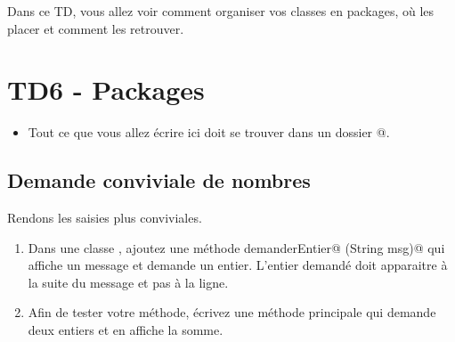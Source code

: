 \documentclass[a4paper,11pt]{article}
\date{2018 -- 2019}
\begin{document}
\entete
\titre
{}
\lastedit


	\begin{tcolorbox}[blanker,
	before skip=10mm,after skip=10mm,
	borderline west={1mm}{-4mm}{lightgray},
	title=Objectifs, coltitle=black, fonttitle=\sffamily\bfseries\large]
	Dans ce TD, vous allez voir comment organiser vos classes en packages, o\`u les placer et comment les retrouver.
	\end{tcolorbox}
	
	\tableofcontents

	\newpage


\section{TD6 - Packages}
	 \begin{consigne}
	 	\begin{itemize}
			\item Tout ce que vous allez \'ecrire ici doit se trouver dans un dossier @.
		\end{itemize}				
	\end{consigne}
	
	\subsection{Demande conviviale de nombres}
		Rendons les saisies plus conviviales.
			
            \par
        
		\begin{enumerate}
				
			\item Dans une classe \verb@Util@, ajoutez une m\'ethode 
				\verb@int demanderEntier@ \verb@(String msg)@
				qui affiche un message et demande un entier.
				L'entier demand\'e doit apparaitre \`a la suite du message
				et pas \`a la ligne.
			
			\item Afin de tester votre m\'ethode, \'ecrivez une m\'ethode principale qui demande 
				deux entiers et en affiche la somme.
			
		\end{enumerate}
				
\end{document}

